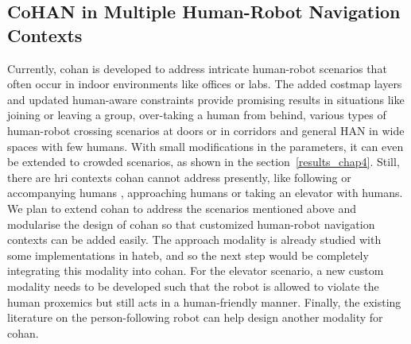\subsection{CoHAN in Multiple Human-Robot Navigation Contexts}
Currently, \acrshort{cohan} is developed to address intricate human-robot scenarios that often occur in indoor environments like offices or labs. The added costmap layers and updated human-aware constraints provide promising results in situations like joining or leaving a group, over-taking a human from behind, various types of human-robot crossing scenarios at doors or in corridors and general HAN in wide spaces with few humans. With small modifications in the parameters, it can even be extended to crowded scenarios, as shown in the section~\ref{results_chap4}. Still, there are \acrshort{hri} contexts \acrshort{cohan} cannot address presently, like following or accompanying humans \cite{repiso2017line}, approaching humans \cite{khambhaita_hfr_2016} or taking an elevator with humans. We plan to extend \acrshort{cohan} to address the scenarios mentioned above and modularise the design of \acrshort{cohan} so that customized human-robot navigation contexts can be added easily. The approach modality is already studied with some implementations in \acrshort{hateb}, and so the next step would be completely integrating this modality into \acrshort{cohan}. For the elevator scenario, a new custom modality needs to be developed such that the robot is allowed to violate the human proxemics but still acts in a human-friendly manner. Finally, the existing literature on the person-following robot can help design another modality for \acrshort{cohan}.

